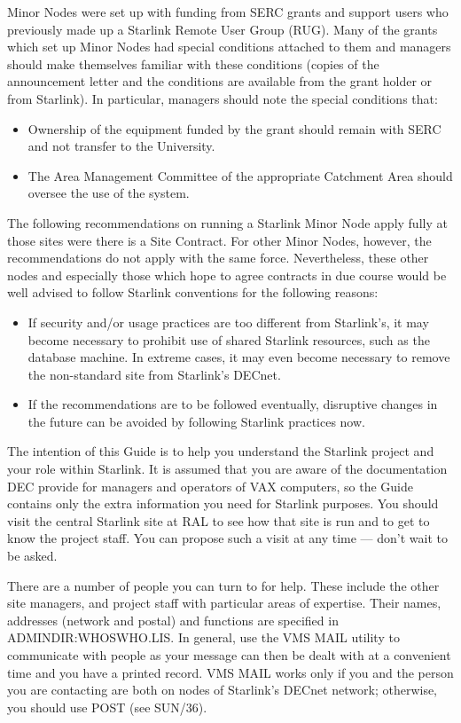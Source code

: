 Minor Nodes were set up with funding from SERC grants and support users who
previously made up a Starlink Remote User Group (RUG).
Many of the grants which set up Minor Nodes had special conditions attached
to them and managers should make themselves familiar with these conditions
(copies of the announcement letter and the conditions are available from
the grant holder or from Starlink).
In particular, managers should note the special conditions that:
\begin{itemize}
\item Ownership of the equipment funded by the grant should remain with SERC
and not transfer to the University.
\item The Area Management Committee of the appropriate Catchment Area should
oversee the use of the system.
\end{itemize}
 
The following recommendations on running a Starlink Minor Node apply fully
at those sites were there is a Site Contract.
For other Minor Nodes, however, the recommendations do not apply with the same
force.
Nevertheless, these other nodes and especially those which hope to agree
contracts in due course would be well advised to follow Starlink conventions
for the following reasons:
\begin{itemize}
\item If security and/or usage practices are too different from Starlink's,
it may become necessary to prohibit use of shared Starlink resources,
such as the database machine.
In extreme cases, it may even become necessary to remove the non-standard site
from Starlink's DECnet.
\item If the recommendations are to be followed eventually, disruptive changes
in the future can be avoided by following Starlink practices now.
\end{itemize}
The intention of this Guide is to help you understand the Starlink project and
your role within Starlink.
It is assumed that you are aware of the documentation DEC provide for managers
and operators of VAX computers, so the Guide contains only the extra information
you need for Starlink purposes.
You should visit the central Starlink site at RAL to see how that site is
run and to get to know the project staff.
You can propose such a visit at any time --- don't wait to be asked.

There are a number of people you can turn to for help.
These include the other site managers, and project staff with particular areas
of expertise.
Their names, addresses (network and postal) and functions are specified in
ADMINDIR:WHOSWHO.LIS.
In general, use the VMS MAIL utility to communicate with people as your message
can then be dealt with at a convenient time and you have a printed record.
VMS MAIL works only if you and the person you are contacting are both on nodes
of Starlink's DECnet network; otherwise, you should use POST (see SUN/36).
 
